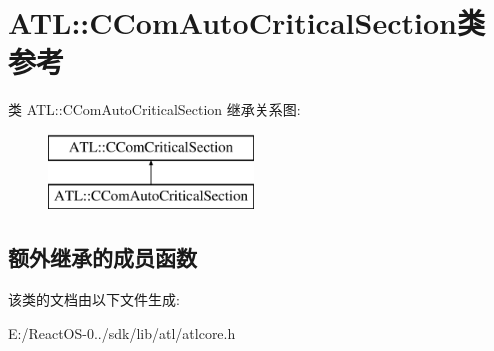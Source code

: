 \hypertarget{class_a_t_l_1_1_c_com_auto_critical_section}{}\section{A\+TL\+:\+:C\+Com\+Auto\+Critical\+Section类 参考}
\label{class_a_t_l_1_1_c_com_auto_critical_section}
类 A\+TL\+:\+:C\+Com\+Auto\+Critical\+Section 继承关系图\+:\begin{figure}[H]
\begin{center}
\leavevmode
\includegraphics[height=2.000000cm]{class_a_t_l_1_1_c_com_auto_critical_section}
\end{center}
\end{figure}
\subsection*{额外继承的成员函数}


该类的文档由以下文件生成\+:\begin{DoxyCompactItemize}
\item 
E\+:/\+React\+O\+S-\/0../sdk/lib/atl/atlcore.\+h\end{DoxyCompactItemize}
